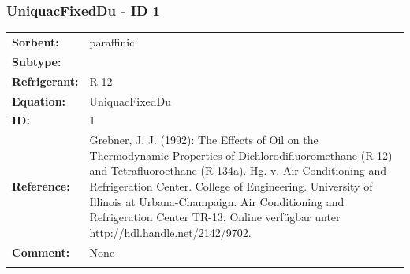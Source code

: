 \subsubsection{UniquacFixedDu - ID 1}
%
\begin{tabular}[l]{|lp{11.5cm}|}
\hline
\addlinespace

\textbf{Sorbent:} & paraffinic \\
\textbf{Subtype:} &  \\
\textbf{Refrigerant:} & R-12 \\
\textbf{Equation:} & UniquacFixedDu \\
\textbf{ID:} & 1 \\
\textbf{Reference:} & Grebner, J. J. (1992): The Effects of Oil on the Thermodynamic Properties of Dichlorodifluoromethane (R-12) and Tetrafluoroethane (R-134a). Hg. v. Air Conditioning and Refrigeration Center. College of Engineering. University of Illinois at Urbana-Champaign. Air Conditioning and Refrigeration Center TR-13. Online verfügbar unter http://hdl.handle.net/2142/9702. \\
\textbf{Comment:} & None \\

\addlinespace
\hline
\end{tabular}
\newline

